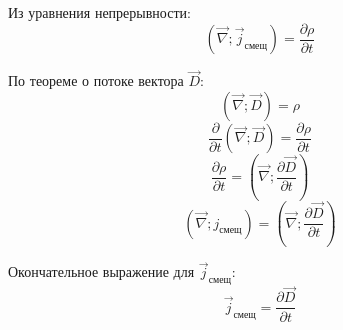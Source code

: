\documentclass{article}
\begin{document}
	Из уравнения непрерывности:
	\begin{equation}
		(\vec\nabla;\vec j_\text{смещ}) = \frac{\partial\rho}{\partial t}
	\end{equation}

	По теореме о потоке вектора $\vec D$:
	\begin{equation}
		(\vec\nabla;\vec D) = \rho
	\end{equation}
	\begin{equation}
		\frac{\partial}{\partial t}(\vec\nabla;\vec D) = \frac{\partial\rho}{\partial t}
	\end{equation}
	\begin{equation}
		\frac{\partial\rho}{\partial t} = (\vec\nabla;\frac{\partial\vec D}{\partial t})
	\end{equation}
	\begin{equation}
		(\vec\nabla;j_\text{смещ}) = (\vec\nabla;\frac{\partial\vec D}{\partial t})
	\end{equation}

	Окончательное выражение для $\vec j_\text{смещ}$:
	\begin{equation}
		\vec j_\text{смещ} = \frac{\partial \vec D}{\partial t}
	\end{equation}
\end{document}
